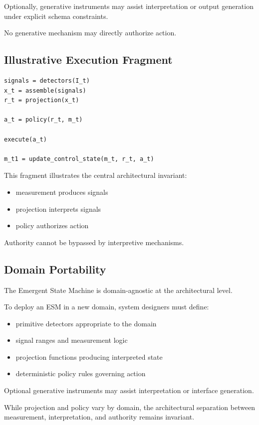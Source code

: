 \documentclass[11pt]{article}
\begin{document}
Optionally, generative instruments may assist interpretation or output generation under explicit schema constraints.

No generative mechanism may directly authorize action.

\subsection{Illustrative Execution Fragment}

\begin{verbatim}
signals = detectors(I_t)
x_t = assemble(signals)
r_t = projection(x_t)

a_t = policy(r_t, m_t)

execute(a_t)

m_t1 = update_control_state(m_t, r_t, a_t)
\end{verbatim}

This fragment illustrates the central architectural invariant:

\begin{itemize}
\item measurement produces signals
\item projection interprets signals
\item policy authorizes action
\end{itemize}

Authority cannot be bypassed by interpretive mechanisms.

\subsection{Domain Portability}

The Emergent State Machine is domain-agnostic at the architectural level.

To deploy an ESM in a new domain, system designers must define:

\begin{itemize}
\item primitive detectors appropriate to the domain
\item signal ranges and measurement logic
\item projection functions producing interpreted state
\item deterministic policy rules governing action
\end{itemize}

Optional generative instruments may assist interpretation or interface generation.

While projection and policy vary by domain, the architectural separation between measurement, interpretation, and authority remains invariant.
\end{document}

